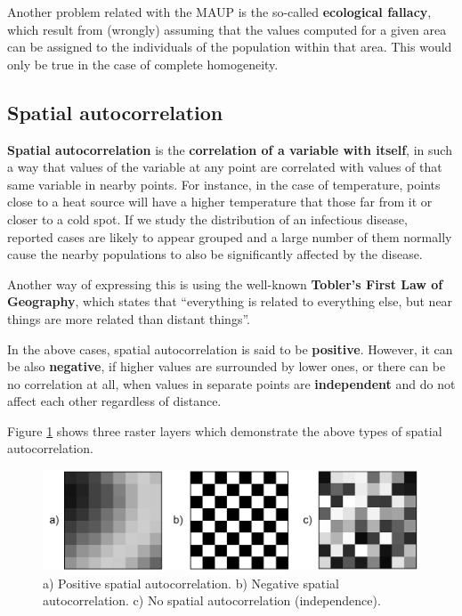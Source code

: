 Another problem related with the MAUP is the so-called \textbf{ecological fallacy}, which result from (wrongly) assuming that the values computed for a given area can be assigned to the individuals of the population within that area. This would only be true in the case of complete homogeneity.


\subsection{Spatial autocorrelation} 

\textbf{Spatial autocorrelation} is the \textbf{correlation of a variable with itself}, in such a way that values of the variable at any point are correlated with values of that same variable in nearby points. For instance, in the case of temperature, points close to a heat source will have a higher temperature that those far from it or closer to a cold spot. If we study the distribution of an infectious disease, reported cases are likely to appear grouped and a large number of them normally cause the nearby populations to also be significantly affected by the disease.

Another way of expressing this is using the well-known \textbf{Tobler's First Law of Geography}, which states that ``everything is related to everything else, but near things are more related than distant things''.

In the above cases, spatial autocorrelation is said to be \textbf{positive}. However, it can be also \textbf{negative}, if higher values are surrounded by lower ones, or there can be no correlation at all, when values in separate points are \textbf{independent} and do not affect each other regardless of distance.

Figure \ref{Fig:Autocorrelation} shows three raster layers which demonstrate the above types of spatial autocorrelation.

\begin{figure}[!hbt]   
\centering
\includegraphics[width=\textwidth]{Analysis/Autocorrelation.png}
\caption{\small a) Positive spatial autocorrelation. b) Negative spatial autocorrelation. c) No spatial autocorrelation (independence).}
\label{Fig:Autocorrelation} 
\end{figure}

